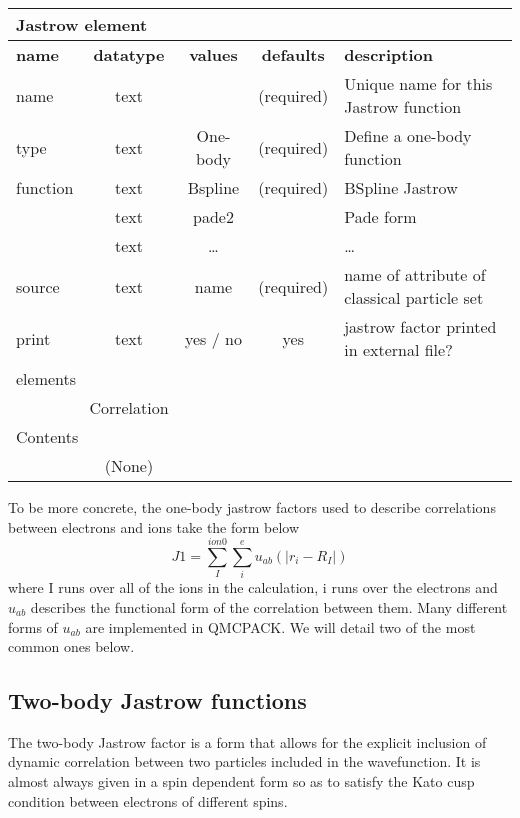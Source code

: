 \begin{table}[h]
\begin{center}
\begin{tabular}{l c c c l }
\hline
\multicolumn{5}{l}{Jastrow element} \\
\hline
\bfseries name & \bfseries datatype & \bfseries values & \bfseries defaults  & \bfseries description \\
\hline
name & text &    & (required) & Unique name for this Jastrow function \\
type & text & One-body & (required) & Define a one-body function \\ 
function & text & Bspline & (required) & BSpline Jastrow \\
             & text & pade2 & & Pade form \\
             & text & \ldots & & \ldots \\
source & text & name & (required) & name of attribute of classical particle set \\ 
print & text & yes / no & yes & jastrow factor printed in external file?\\
  \hline
\multicolumn{5}{l}{elements}\\ \hline
& Correlation & & & \\ \hline
\multicolumn{5}{l}{Contents}\\ \hline
& (None)  & & &  \\ \hline
\end{tabular}
\end{center}
\end{table}

To be more concrete, the one-body jastrow factors used to describe correlations
between electrons and ions take the form below
\begin{equation}
J1=\sum_I^{ion0}\sum_i^e u_{ab}(|r_i-R_I|)
\end{equation}
where I runs over all of the ions in the calculation, i runs over the electrons
and $u_{ab}$ describes the functional form of the correlation between them.
Many different forms of $u_{ab}$ are implemented in QMCPACK.  We will detail 
two of the most common ones below.



\subsection{Two-body Jastrow functions}
The two-body Jastrow factor is a form that allows for the explicit inclusion
of dynamic correlation between two particles included in the wavefunction.  It
is almost always given in a spin dependent form so as to satisfy the Kato cusp
condition between electrons of different spins\cite{kato}.

